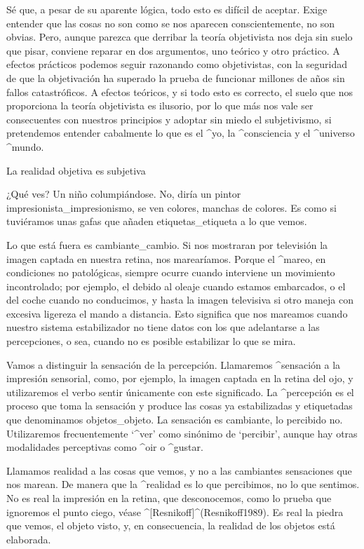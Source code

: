Sé que, a pesar de su aparente lógica, todo esto es difícil de aceptar.
Exige entender que las cosas no son como se nos aparecen
conscientemente, no son obvias. Pero, aunque parezca que derribar la
teoría objetivista nos deja sin suelo que pisar, conviene reparar en dos
argumentos, uno teórico y otro práctico. A efectos prácticos podemos
seguir razonando como objetivistas, con la seguridad de que la
objetivación ha superado la prueba de funcionar millones de años sin
fallos catastróficos. A efectos teóricos, y si todo esto es correcto, el
suelo que nos proporciona la teoría objetivista es ilusorio, por lo que
más nos vale ser consecuentes con nuestros principios y adoptar sin
miedo el subjetivismo, si pretendemos entender cabalmente lo que es el
^{yo}, la ^{consciencia} y el ^{universo} ^{mundo}.

\vfill\break

\Section La realidad objetiva es subjetiva

¿Qué ves? Un niño columpiándose. No, diría un pintor
impresionista_{impresionismo}, se ven colores, manchas de colores. Es
como si tuviéramos unas gafas que añaden etiquetas_{etiqueta} a lo que
vemos. %

Lo que está fuera es cambiante_{cambio}. Si nos mostraran por televisión
la imagen captada en nuestra retina, nos marearíamos. Porque el
^{mareo}, en condiciones no patológicas, siempre ocurre cuando
interviene un movimiento incontrolado; por ejemplo, el debido al oleaje
cuando estamos embarcados, o el del coche cuando no conducimos, y hasta
la imagen televisiva si otro maneja con excesiva ligereza el mando a
distancia. Esto significa que nos mareamos cuando nuestro sistema
estabilizador no tiene datos con los que adelantarse a las percepciones,
o sea, cuando no es posible estabilizar lo que se mira.

Vamos a distinguir la sensación de la percepción. Llamaremos
^{sensación} a la impresión sensorial, como, por ejemplo, la imagen
captada en la retina del ojo, y utilizaremos el verbo sentir únicamente
con este significado. La ^{percepción} es el proceso que toma la
sensación y produce las cosas ya estabilizadas y etiquetadas que
denominamos objetos_{objeto}. La sensación es cambiante, lo percibido
no. Utilizaremos frecuentemente `^{ver}' como sinónimo de `percibir',
aunque hay otras modalidades perceptivas como ^{oir} o ^{gustar}.

Llamamos realidad a las cosas que vemos, y no a las cambiantes
sensaciones que nos marean. De manera que la ^{realidad} es lo que
percibimos, no lo que sentimos. No es real la impresión en la retina,
que desconocemos, como lo prueba que ignoremos el punto ciego, véase
^[Resnikoff]^(Resnikoff1989). Es real la piedra que vemos, el objeto
visto, y, en consecuencia, la realidad de los objetos está elaborada.

